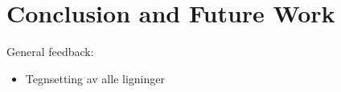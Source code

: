 \chapter{Conclusion and Future Work}

{\color{red}
General feedback:
\begin{itemize}
    \item Tegnsetting av alle ligninger
\end{itemize}
}
